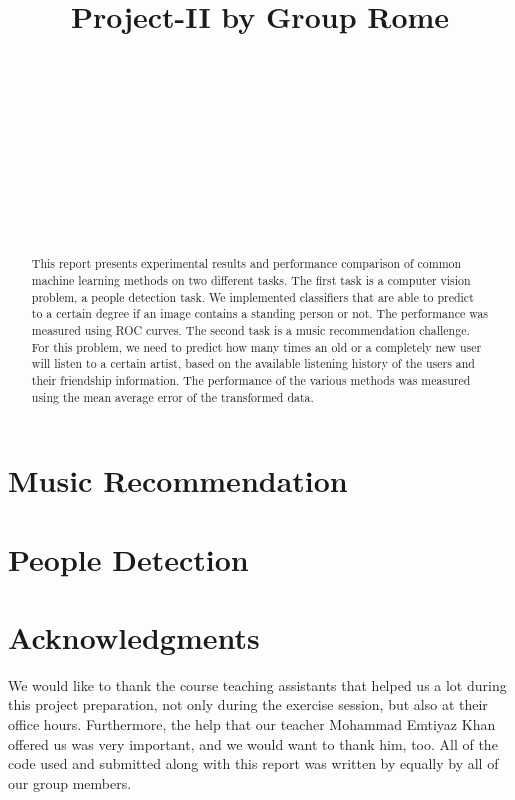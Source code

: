 \documentclass{article} %
\title{Project-II by Group Rome}
\author{
\fontsize{8}{8}\selectfont{Cimen Gokcen}\\
\fontsize{8}{8}\selectfont{EPFL} \\
\fontsize{8}{8}\selectfont{\texttt{gokcen.cimen@epfl.ch}} \\
\And
\fontsize{8}{8}\selectfont{Angelopoulos Vasileios} \\
\fontsize{8}{8}\selectfont{EPFL} \\
\fontsize{8}{8}\selectfont{\texttt{vasileios.angelopoulos@epfl.ch}} \\
\And
\fontsize{8}{8}\selectfont{Petrescu Viviana}\\
\fontsize{8}{8}\selectfont{EPFL} \\
\fontsize{8}{8}\selectfont{\texttt{viviana.petrescu@epfl.ch}} \\
}
\begin{document}
\maketitle

\begin{abstract}
This report presents experimental results and performance comparison of common machine 
learning methods on two different tasks. The first task is a computer vision problem, a people detection task.
We implemented classifiers that are able to predict to a certain degree if an image contains a standing person or not.
The performance was measured using ROC curves. The second task is a music recommendation challenge. 
For this problem, we need to predict how many times an old or a completely new user will listen to a certain artist, based on the available listening history of the users and their friendship information.
The performance of the various methods was measured using the mean average error of the transformed data.
\end{abstract}

\section{Music Recommendation}


\section{People Detection}


\section*{Acknowledgments}
We would like to thank the course teaching assistants that helped us a lot during this project preparation, not only during the exercise session, but also at their office hours. Furthermore, the help that our teacher Mohammad Emtiyaz Khan offered us was very  important, and we would want to thank him, too. All of the code used and submitted along with this report was written by equally by all of our group members.
\end{document}
